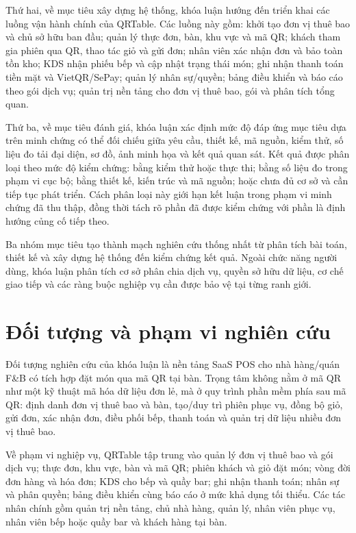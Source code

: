 Thứ hai, về mục tiêu xây dựng hệ thống, khóa luận hướng đến triển khai các luồng vận hành chính của QRTable. Các luồng này gồm: khởi tạo đơn vị thuê bao và chủ sở hữu ban đầu; quản lý thực đơn, bàn, khu vực và mã QR; khách tham gia phiên qua QR, thao tác giỏ và gửi đơn; nhân viên xác nhận đơn và bảo toàn tồn kho; KDS nhận phiếu bếp và cập nhật trạng thái món; ghi nhận thanh toán tiền mặt và VietQR/SePay; quản lý nhân sự/quyền; bảng điều khiển và báo cáo theo gói dịch vụ; quản trị nền tảng cho đơn vị thuê bao, gói và phân tích tổng quan.

Thứ ba, về mục tiêu đánh giá, khóa luận xác định mức độ đáp ứng mục tiêu dựa trên minh chứng có thể đối chiếu giữa yêu cầu, thiết kế, mã nguồn, kiểm thử, số liệu đo tải đại diện, sơ đồ, ảnh minh họa và kết quả quan sát. Kết quả được phân loại theo mức độ kiểm chứng: bằng kiểm thử hoặc thực thi; bằng số liệu đo trong phạm vi cục bộ; bằng thiết kế, kiến trúc và mã nguồn; hoặc chưa đủ cơ sở và cần tiếp tục phát triển. Cách phân loại này giới hạn kết luận trong phạm vi minh chứng đã thu thập, đồng thời tách rõ phần đã được kiểm chứng với phần là định hướng củng cố tiếp theo.

Ba nhóm mục tiêu tạo thành mạch nghiên cứu thống nhất từ phân tích bài toán, thiết kế và xây dựng hệ thống đến kiểm chứng kết quả. Ngoài chức năng người dùng, khóa luận phân tích cơ sở phân chia dịch vụ, quyền sở hữu dữ liệu, cơ chế giao tiếp và các ràng buộc nghiệp vụ cần được bảo vệ tại từng ranh giới.

\section{Đối tượng và phạm vi nghiên cứu}

Đối tượng nghiên cứu của khóa luận là nền tảng SaaS POS cho nhà hàng/quán F\&B có tích hợp đặt món qua mã QR tại bàn. Trọng tâm không nằm ở mã QR như một kỹ thuật mã hóa dữ liệu đơn lẻ, mà ở quy trình phần mềm phía sau mã QR: định danh đơn vị thuê bao và bàn, tạo/duy trì phiên phục vụ, đồng bộ giỏ, gửi đơn, xác nhận đơn, điều phối bếp, thanh toán và quản trị dữ liệu nhiều đơn vị thuê bao.

Về phạm vi nghiệp vụ, QRTable tập trung vào quản lý đơn vị thuê bao và gói dịch vụ; thực đơn, khu vực, bàn và mã QR; phiên khách và giỏ đặt món; vòng đời đơn hàng và hóa đơn; KDS cho bếp và quầy bar; ghi nhận thanh toán; nhân sự và phân quyền; bảng điều khiển cùng báo cáo ở mức khả dụng tối thiểu. Các tác nhân chính gồm quản trị nền tảng, chủ nhà hàng, quản lý, nhân viên phục vụ, nhân viên bếp hoặc quầy bar và khách hàng tại bàn.

